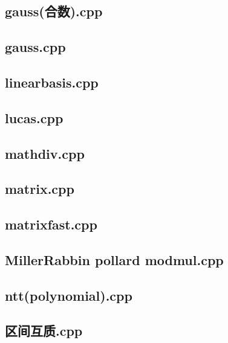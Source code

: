 \subsection{gauss(合数).cpp}


\subsection{gauss.cpp}


\subsection{linearbasis.cpp}


\subsection{lucas.cpp}


\subsection{mathdiv.cpp}


\subsection{matrix.cpp}


\subsection{matrixfast.cpp}


\subsection{MillerRabbin pollard modmul.cpp}


\subsection{ntt(polynomial).cpp}


\subsection{区间互质.cpp}



